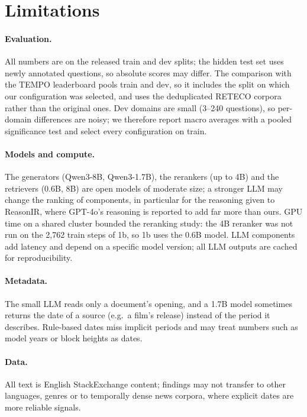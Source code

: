 \section*{Limitations}
\paragraph{Evaluation.} All numbers are on the released train and dev splits; the hidden test
set uses newly annotated questions, so absolute scores may differ. The comparison with the
TEMPO leaderboard pools train and dev, so it includes the split on which our configuration was
selected, and uses the deduplicated RETECO corpora rather than the original ones. Dev domains
are small (3--240 questions), so per-domain differences are noisy; we therefore report macro
averages with a pooled significance test and select every configuration on train.

\paragraph{Models and compute.} The generators (Qwen3-8B, Qwen3-1.7B), the rerankers (up to 4B)
and the retrievers (0.6B, 8B) are open models of moderate size; a stronger LLM may change the
ranking of components, in particular for the reasoning given to ReasonIR, where GPT-4o's
reasoning is reported to add far more than ours. GPU time on a shared cluster bounded the
reranking study: the 4B reranker was not run on the 2{,}762 train steps of 1b, so 1b uses the
0.6B model. LLM components add latency and depend on a specific model version; all LLM outputs
are cached for reproducibility.

\paragraph{Metadata.} The small LLM reads only a document's opening, and a 1.7B model
sometimes returns the date of a source (e.g.\ a film's release) instead of the period it
describes. Rule-based dates miss implicit periods and may treat numbers such as model years or
block heights as dates.

\paragraph{Data.} All text is English StackExchange content; findings may not transfer to
other languages, genres or to temporally dense news corpora, where explicit dates are more
reliable signals.
